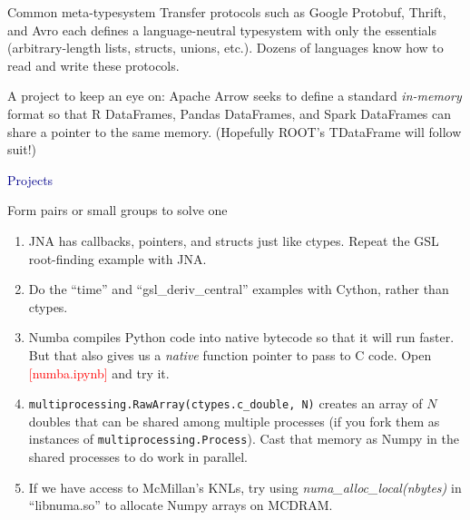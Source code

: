 \documentclass{beamer}
\begin{document}
\begin{frame}{Common meta-typesystem}
Transfer protocols such as Google Protobuf, Thrift, and Avro each defines a language-neutral typesystem with only the essentials (arbitrary-length lists, structs, unions, etc.). Dozens of languages know how to read and write these protocols.

\vfill
A project to keep an eye on: Apache Arrow seeks to define a standard {\it in-memory} format so that R DataFrames, Pandas DataFrames, and Spark DataFrames can share a pointer to the same memory. (Hopefully ROOT's TDataFrame will follow suit!)
\end{frame}

\begin{frame}{}
\begin{center}
\textcolor{darkblue}{\LARGE Projects}
\end{center}
\end{frame}

\begin{frame}{Form pairs or small groups to solve one}
\vspace{0.3 cm}
\begin{enumerate}\setlength{\itemsep}{0.2 cm}
\item JNA has callbacks, pointers, and structs just like ctypes. Repeat the GSL root-finding example with JNA.
\item Do the ``time'' and ``gsl\_deriv\_central'' examples with Cython, rather than ctypes.
\item Numba compiles Python code into native bytecode so that it will run faster. But that also gives us a {\it native} function pointer to pass to C code. Open \textcolor{red}{[numba.ipynb]} and try it.
\item {\tt\small multiprocessing.RawArray(ctypes.c\_double, N)} creates an array of $N$ doubles that can be shared among multiple processes (if you fork them as instances of {\tt\small multiprocessing.Process}). Cast that memory as Numpy in the shared processes to do work in parallel.
\item If we have access to McMillan's KNLs, try using {\it numa\_alloc\_local(nbytes)} in ``libnuma.so'' to allocate Numpy arrays on MCDRAM.
\end{enumerate}
\end{frame}
\end{document}

